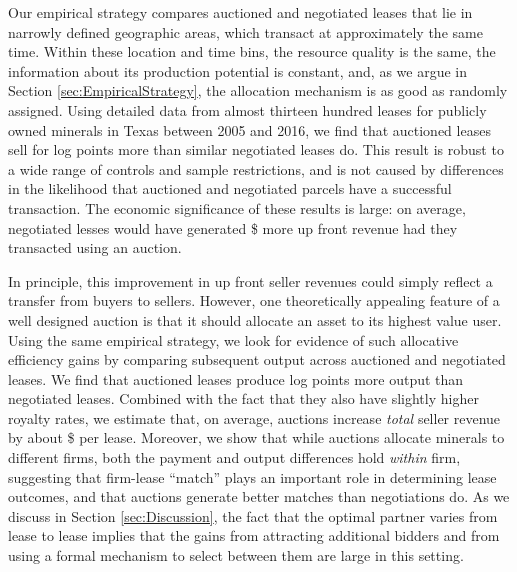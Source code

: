 \documentclass[12pt]{article}
\newcommand{\inputy}[1]{\unskip}
\begin{document}
Our empirical strategy compares auctioned and negotiated leases that lie in narrowly defined geographic areas, which transact at approximately the same time.  Within these location and time bins, the resource quality is the same, the information about its production potential is constant, and, as we argue in Section \ref{sec:EmpiricalStrategy}, the allocation mechanism is as good as randomly assigned.  Using detailed data from almost thirteen hundred leases for publicly owned minerals in Texas between 2005 and 2016, we find that auctioned leases sell for \inputy{../output/estimates/Bonus_Grid10Yr_log.tex} log points more than similar negotiated leases do. This result is robust to a wide range of controls and sample restrictions, and is not caused by differences in the likelihood that auctioned and negotiated parcels have a successful transaction. The economic significance of these results is large: on average, negotiated lesses would have generated \$\inputy{../output/estimates/Bonus_Grid10Yr_log_total.tex} more up front revenue had they transacted using an auction.

In principle, this improvement in up front seller revenues could simply reflect a transfer from buyers to sellers. However, one theoretically appealing feature of a well designed auction is that it should allocate an asset to its highest value user. Using the same empirical strategy, we look for evidence of such allocative efficiency gains by comparing subsequent output across auctioned and negotiated leases. We find that auctioned leases produce \inputy{../output/estimates/Poisson_LeaseRevenue_Grid10Yr.tex} log points more output than negotiated leases. Combined with the fact that they also have slightly higher royalty rates, we estimate that, on average, auctions increase \textit{total} seller revenue by about \$\inputy{../output/estimates/SellerRevenue_Grid10Yr_total.tex} per lease. Moreover, we show that while auctions allocate minerals to different firms, both the payment and output differences hold \textit{within} firm, suggesting that firm-lease ``match'' plays an important role in determining lease outcomes, and that auctions generate better matches than negotiations do. As we discuss in Section \ref{sec:Discussion}, the fact that the optimal partner varies from lease to lease implies that the gains from attracting additional bidders and from using a formal mechanism to select between them are large in this setting. 
\end{document}
